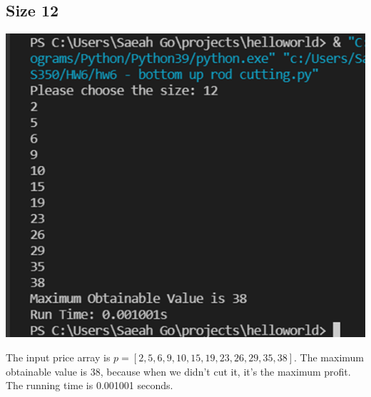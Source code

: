 \documentclass{article}
\begin{document}
\subsection{\textbf{Size 12}} 
\begin{center}
\includegraphics[scale = 0.5]{size 12.png} \\
\end{center}
The input price array is $p = [2, 5, 6, 9, 10, 15, 19, 23, 26, 29, 35, 38]$. The maximum obtainable value is 38, because when we didn't cut it, it's the maximum profit. The running time is 0.001001 seconds. 
\end{document}

